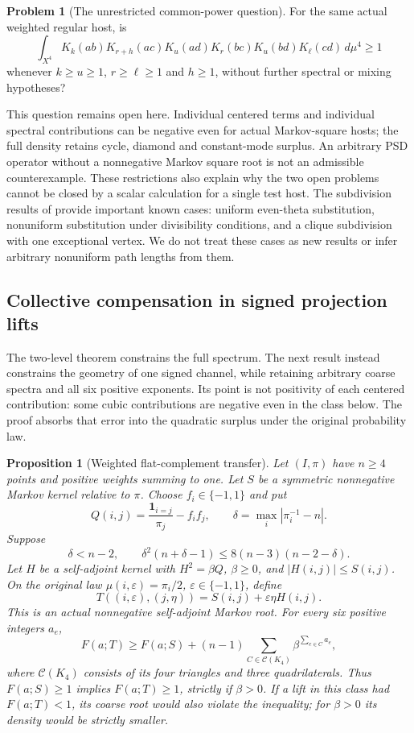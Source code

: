 \documentclass[a4paper,11pt,reqno]{amsart}
\theoremstyle{plain}
\newtheorem{proposition}[theorem]{Proposition}
\theoremstyle{definition}
\newtheorem{problem}[theorem]{Problem}
\theoremstyle{remark}
\begin{document}
\begin{problem}[The unrestricted common-power question]
\label{problem-unrestricted-common-powers}
For the same actual weighted regular host, is
\[
 \int_{X^4}K_k(ab)K_{r+h}(ac)K_u(ad)
 K_r(bc)K_u(bd)K_\ell(cd)\,d\mu^4\ge1
\]
whenever $k\ge u\ge1$, $r\ge\ell\ge1$ and $h\ge1$,
without further spectral or mixing hypotheses?
\end{problem}

This question remains open here.  Individual centered terms and individual
spectral contributions can be negative even for actual Markov-square hosts; the full
density retains cycle, diamond and constant-mode surplus.  An arbitrary
PSD operator without a nonnegative Markov square root is not an admissible
counterexample.  These restrictions also explain why the two open problems
cannot be closed by a scalar calculation for a single test host.
The subdivision results of \citet[Theorems~1.3, 1.4 and 1.6]{imliliu2026}
provide important known cases: uniform even-theta substitution, nonuniform
substitution under divisibility conditions, and a clique subdivision with
one exceptional vertex.  We do not treat these cases as new results or
infer arbitrary nonuniform path lengths from them.

\subsection{Collective compensation in signed projection lifts}
The two-level theorem constrains the full spectrum.  The next result
instead constrains the geometry of one signed channel, while retaining
arbitrary coarse spectra and all six positive exponents.  Its point is
not positivity of each centered contribution: some cubic contributions
are negative even in the class below.  The proof absorbs that error into
the quadratic surplus under the original probability law.

\begin{proposition}[Weighted flat-complement transfer]
\label{proposition-weighted-projection-lift}
Let $(I,\pi)$ have $n\ge4$ points and positive weights summing to one.
Let $S$ be a symmetric nonnegative Markov kernel relative to $\pi$.
Choose $f_i\in\{-1,1\}$ and put
\[
 Q(i,j)=\frac{\mathbf1_{i=j}}{\pi_j}-f_if_j,
 \qquad \delta=\max_i|\pi_i^{-1}-n|.
\]
Suppose
\[
 \delta<n-2,\qquad
 \delta^2(n+\delta-1)\le8(n-3)(n-2-\delta).
\]
Let $H$ be a self-adjoint kernel with $H^2=\beta Q$, $\beta\ge0$,
and $|H(i,j)|\le S(i,j)$.  On the original law
$\mu(i,\varepsilon)=\pi_i/2$, $\varepsilon\in\{-1,1\}$, define
\[
 T((i,\varepsilon),(j,\eta))=S(i,j)+\varepsilon\eta H(i,j).
\]
This is an actual nonnegative self-adjoint Markov root.  For every six
positive integers $a_e$,
\[
 F(a;T)\ge F(a;S)+(n-1)
       \sum_{C\in\mathcal C(K_4)}\beta^{\sum_{e\in C}a_e},
\]
where $\mathcal C(K_4)$ consists of its four triangles and three
quadrilaterals.  Thus $F(a;S)\ge1$ implies $F(a;T)\ge1$, strictly if
$\beta>0$.  If a lift in this class had $F(a;T)<1$, its coarse root
would also violate the inequality; for $\beta>0$ its density would be
strictly smaller.
\end{proposition}
\end{document}
